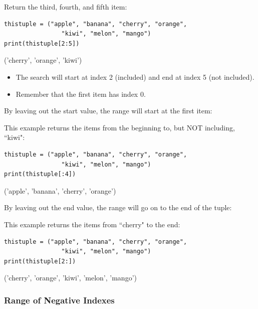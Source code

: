 \documentclass[12pt,a4paper]{article}
\begin{document}
\begin{ebox}
Return the third, fourth, and fifth item:
	\begin{lstlisting}
thistuple = ("apple", "banana", "cherry", "orange",
                "kiwi", "melon", "mango")
print(thistuple[2:5])
	\end{lstlisting}
\tcblower
	\begin{vercode}
('cherry', 'orange', 'kiwi')
	\end{vercode}
\end{ebox}

\begin{nbox}
	\begin{itemize}
	\item The search will start at index 2 (included)
		and end at index 5 (not included).
	\item Remember that the first item has index 0.
	\end{itemize}
\end{nbox}

By leaving out the start value, the range will start at the first item:

\begin{ebox}
This example returns the items from the beginning to, but NOT including, ``kiwi":
	\begin{lstlisting}
thistuple = ("apple", "banana", "cherry", "orange",
				"kiwi", "melon", "mango")
print(thistuple[:4])
	\end{lstlisting}
\tcblower
	\begin{vercode}
('apple', 'banana', 'cherry', 'orange')
	\end{vercode}
\end{ebox}

By leaving out the end value, the range will go on to the end of the tuple:

\begin{ebox}
This example returns the items from ``cherry" to the end:
	\begin{lstlisting}
thistuple = ("apple", "banana", "cherry", "orange",
                "kiwi", "melon", "mango")
print(thistuple[2:])
	\end{lstlisting}
\tcblower
	\begin{vercode}
('cherry', 'orange', 'kiwi', 'melon', 'mango')
	\end{vercode}
\end{ebox}
\subsubsection{Range of Negative Indexes}
\end{document}

